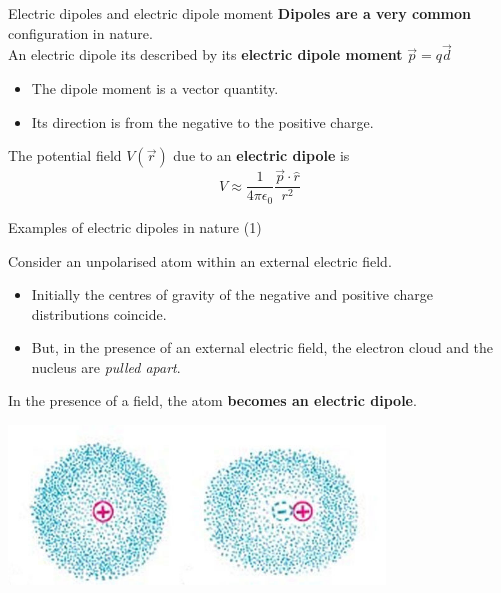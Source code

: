 \begin{frame}{Electric dipoles and electric dipole moment}
\vspace{0.2cm}
{\bf Dipoles are a very common} configuration in nature.\\

\vspace{0.2cm}
An electric dipole its described by its {\bf electric dipole moment} $\vec{p} = q \vec{d}$\\
\begin{itemize}
  \item The dipole moment is a vector quantity.
  \item Its direction is from the negative to the positive charge.\\
\end{itemize}

The potential field $V(\vec{r})$ due to an {\bf electric dipole} is
\begin{equation*}
   V \approx \frac{1}{4\pi\epsilon_0} \frac{\vec{p} \cdot \hat{r}}{r^2}
\end{equation*}

\end{frame}


%
%
%

\begin{frame}{Examples of electric dipoles in nature (1)}

Consider an unpolarised atom within an external electric field.\\
\begin{itemize}
  \item Initially the centres of gravity of the negative and positive charge distributions coincide.
  \item But, in the presence of an external electric field, the electron cloud and the nucleus are {\em pulled apart}.
\end{itemize}
In the presence of a field, the atom {\bf becomes an electric dipole}.\\
\vspace{0.2cm}
\begin{center}
  \includegraphics[width=0.75\textwidth]{./images/schematics/dipole_atom_1.jpg}\\
\end{center}

\end{frame}

